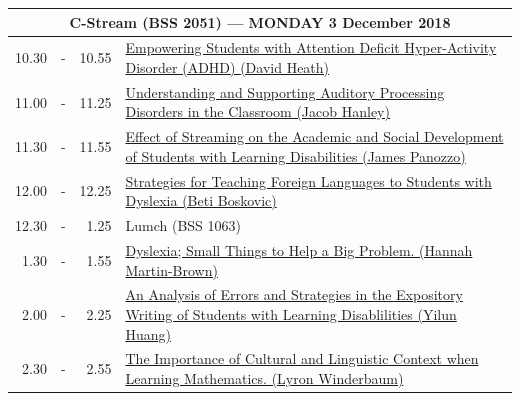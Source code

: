 \documentclass[twoside,12pt,a4paper,notitlepage]{memoir}
\begin{document}
\begin{center}
\begin{tabular}{rcr|p{10.8cm}}
 \multicolumn{4}{c}{{\large C-Stream (BSS 2051) --- MONDAY 3 December 2018}} \\ \hline
 10.30 & - & 10.55 & 
 \hyperref[aut:heath]{Empowering Students with Attention Deficit Hyper-Activity Disorder (ADHD) (David Heath)} \\ \hline
11.00 & - & 11.25 &
 \hyperref[aut:hanley]{Understanding and Supporting Auditory Processing Disorders in the Classroom (Jacob Hanley)} \\ \hline
11.30 & - & 11.55 &
 \hyperref[aut:panozzo]{Effect of Streaming on the Academic and Social Development of Students with Learning Disabilities (James Panozzo)} \\ \hline
12.00 & - & 12.25 &
 \hyperref[aut:boskovic]{Strategies for Teaching Foreign Languages to Students with Dyslexia (Beti Boskovic)} \\ \hline
12.30 & - & 1.25 & Lumch (BSS 1063) \\ \hline
1.30 & - & 1.55 &
 \hyperref[aut:brown]{Dyslexia; Small Things to Help a Big Problem. (Hannah Martin-Brown)} \\ \hline
2.00 & - & 2.25 &
 \hyperref[aut:huang]{An Analysis of Errors and Strategies in the Expository Writing of Students with Learning Disablilities (Yilun Huang)} \\ \hline
2.30 & - & 2.55 &
 \hyperref[aut:winderbaum]{The Importance of Cultural and Linguistic Context when Learning Mathematics. (Lyron Winderbaum)} \\ \hline
\end{tabular}
\end{center}
\end{document}
